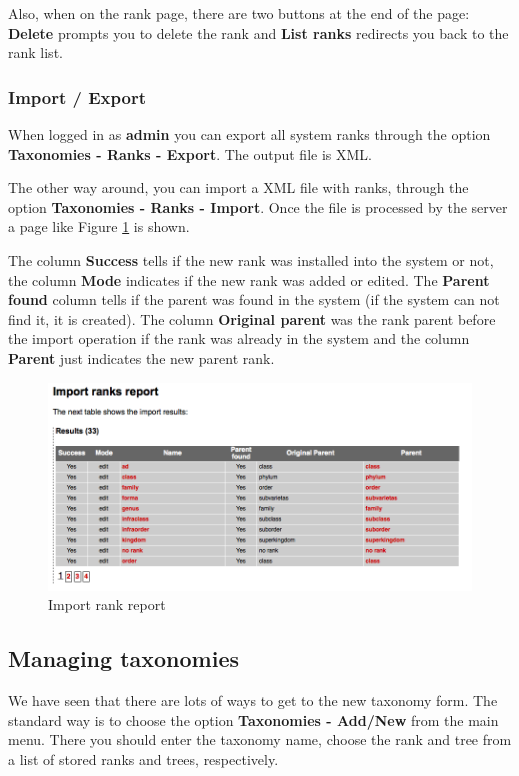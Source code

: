 Also, when on the rank page, there are two buttons at the end of the page: \textbf{Delete} prompts you to
delete the rank and \textbf{List ranks} redirects you back to the rank list.

\subsubsection{Import / Export}

When logged in as \textbf{admin} you can export all system ranks through the option
\textbf{Taxonomies - Ranks - Export}. The output file is XML.

The other way around, you can import a XML file with ranks, through the option
\textbf{Taxonomies - Ranks - Import}. Once the file is processed by the server
a page like Figure \ref{fig:rank_import} is shown.

The column \textbf{Success} tells if the new rank was installed into the system or not,
the column \textbf{Mode} indicates if the new rank was added or edited. The \textbf{Parent found}
column tells if the parent was found in the system (if the system can not find it, it is created).
The column \textbf{Original parent} was the rank parent before the import operation if the rank
was already in the system and the column \textbf{Parent} just indicates the new parent rank.

\begin{figure}[H]
  \centering
    \includegraphics[scale=0.4]{rank_import.png}
  \caption{Import rank report}
  \label{fig:rank_import}
\end{figure}

\subsection{Managing taxonomies}

We have seen that there are lots of ways to get to the new taxonomy form. The standard way is to
choose the option \textbf{Taxonomies - Add/New} from the main menu. There you should enter the
taxonomy name, choose the rank and tree from a list of stored ranks and trees, respectively.

